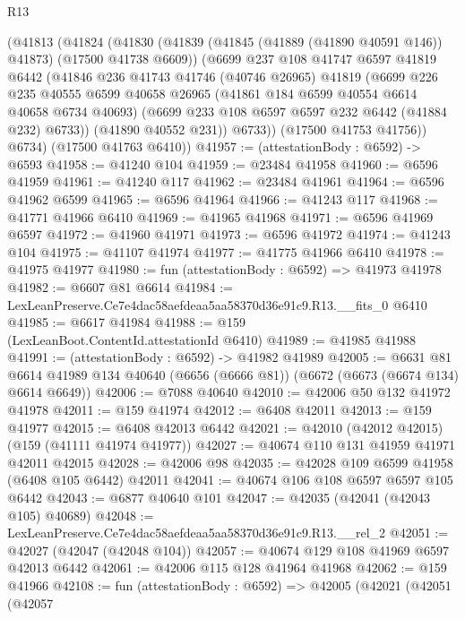 \begin{lexlean}{R13}
\begin{coremodule}
      (@41813
        (@41824
          (@41830
            (@41839 (@41845 (@41889 (@41890 @40591 @146)) @41873) (@17500 @41738 @6609))
            (@6699
              @237
              @108
              @41747
              @6597
              @41819
              @6442
              (@41846
                @236
                @41743
                @41746
                (@40746 @26965)
                @41819
                (@6699
                  @226
                  @235
                  @40555
                  @6599
                  @40658
                  @26965
                  (@41861 @184 @6599 @40554 @6614 @40658 @6734 @40693)
                  (@6699 @233 @108 @6597 @6597 @232 @6442 (@41884 @232) @6733))
                (@41890 @40552 @231))
              @6733))
          (@17500 @41753 @41756))
        @6734)
      (@17500 @41763 @6410))
@41957 := (attestationBody : @6592) -> @6593
@41958 := @41240 @104
@41959 := @23484 @41958
@41960 := @6596 @41959
@41961 := @41240 @117
@41962 := @23484 @41961
@41964 := @6596 @41962 @6599
@41965 := @6596 @41964
@41966 := @41243 @117
@41968 := @41771 @41966 @6410
@41969 := @41965 @41968
@41971 := @6596 @41969 @6597
@41972 := @41960 @41971
@41973 := @6596 @41972
@41974 := @41243 @104
@41975 := @41107 @41974
@41977 := @41775 @41966 @6410
@41978 := @41975 @41977
@41980 := fun (attestationBody : @6592) => @41973 @41978
@41982 := @6607 @81 @6614
@41984 := LexLeanPreserve.Ce7e4dac58aefdeaa5aa58370d36e91c9.R13.__fits_0 @6410
@41985 := @6617 @41984
@41988 := @159 (LexLeanBoot.ContentId.attestationId @6410)
@41989 := @41985 @41988
@41991 := (attestationBody : @6592) -> @41982 @41989
@42005 := @6631
    @81
    @6614
    @41989
    @134
    @40640
    (@6656 (@6666 @81))
    (@6672 (@6673 (@6674 @134) @6614 @6649))
@42006 := @7088 @40640
@42010 := @42006 @50 @132 @41972 @41978
@42011 := @159 @41974
@42012 := @6408 @42011
@42013 := @159 @41977
@42015 := @6408 @42013 @6442
@42021 := @42010 (@42012 @42015) (@159 (@41111 @41974 @41977))
@42027 := @40674 @110 @131 @41959 @41971 @42011 @42015
@42028 := @42006 @98
@42035 := @42028 @109 @6599 @41958 (@6408 @105 @6442) @42011
@42041 := @40674 @106 @108 @6597 @6597 @105 @6442
@42043 := @6877 @40640 @101
@42047 := @42035 (@42041 (@42043 @105) @40689)
@42048 := LexLeanPreserve.Ce7e4dac58aefdeaa5aa58370d36e91c9.R13.__rel_2
@42051 := @42027 (@42047 (@42048 @104))
@42057 := @40674 @129 @108 @41969 @6597 @42013 @6442
@42061 := @42006 @115 @128 @41964 @41968
@42062 := @159 @41966
@42108 := fun (attestationBody : @6592) =>
  @42005
    (@42021
      (@42051
        (@42057

\end{coremodule}
\end{lexlean}
